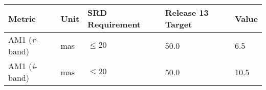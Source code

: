 \begin{longtable}[]{@{}lllll@{}}
\toprule
\begin{minipage}[b]{0.19\columnwidth}\raggedright\strut
Metric\strut
\end{minipage} & \begin{minipage}[b]{0.08\columnwidth}\raggedright\strut
Unit\strut
\end{minipage} & \begin{minipage}[b]{0.20\columnwidth}\raggedright\strut
SRD Requirement\strut
\end{minipage} & \begin{minipage}[b]{0.22\columnwidth}\raggedright\strut
Release 13 Target\strut
\end{minipage} & \begin{minipage}[b]{0.17\columnwidth}\raggedright\strut
Value\strut
\end{minipage}\tabularnewline
\midrule
\endhead
\begin{minipage}[t]{0.19\columnwidth}\raggedright\strut
AM1 (\emph{r}-band)\strut
\end{minipage} & \begin{minipage}[t]{0.08\columnwidth}\raggedright\strut
mas\strut
\end{minipage} & \begin{minipage}[t]{0.20\columnwidth}\raggedright\strut
\(\leq 20\)\strut
\end{minipage} & \begin{minipage}[t]{0.22\columnwidth}\raggedright\strut
50.0\strut
\end{minipage} & \begin{minipage}[t]{0.17\columnwidth}\raggedright\strut
6.5\strut
\end{minipage}\tabularnewline
\begin{minipage}[t]{0.19\columnwidth}\raggedright\strut
AM1 (\emph{i}-band)\strut
\end{minipage} & \begin{minipage}[t]{0.08\columnwidth}\raggedright\strut
mas\strut
\end{minipage} & \begin{minipage}[t]{0.20\columnwidth}\raggedright\strut
\(\leq 20\)\strut
\end{minipage} & \begin{minipage}[t]{0.22\columnwidth}\raggedright\strut
50.0\strut
\end{minipage} & \begin{minipage}[t]{0.17\columnwidth}\raggedright\strut
10.5\strut
\end{minipage}\tabularnewline

\end{longtable}
